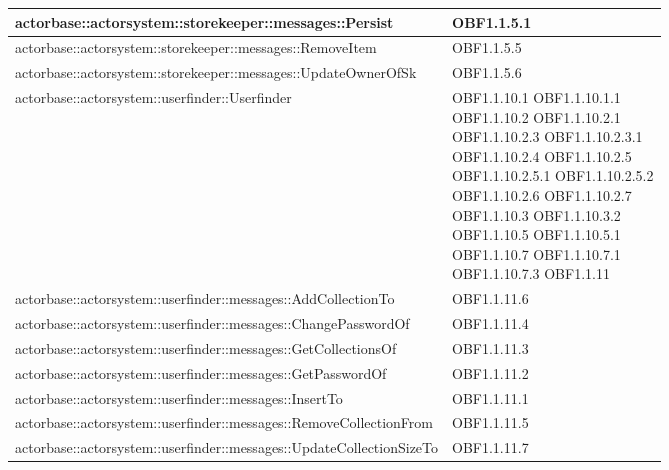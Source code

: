 \documentclass{scalatekids-article}
\begin{document}
\begin{longtable}[H]{|p{12cm}|p{5.5cm}|}
\hline
actorbase::actorsystem::storekeeper::messages::Persist & \multiLineCell[t]{OBF1.1.5.1\\}\\
\hline
actorbase::actorsystem::storekeeper::messages::RemoveItem & \multiLineCell[t]{OBF1.1.5.5\\}\\
\hline
actorbase::actorsystem::storekeeper::messages::UpdateOwnerOfSk & \multiLineCell[t]{OBF1.1.5.6\\}\\
\hline
actorbase::actorsystem::userfinder::Userfinder & \multiLineCell[t]{OBF1.1.10.1 OBF1.1.10.1.1\\OBF1.1.10.2 OBF1.1.10.2.1\\OBF1.1.10.2.3 OBF1.1.10.2.3.1\\OBF1.1.10.2.4 OBF1.1.10.2.5\\OBF1.1.10.2.5.1 OBF1.1.10.2.5.2\\OBF1.1.10.2.6 OBF1.1.10.2.7\\OBF1.1.10.3 OBF1.1.10.3.2\\OBF1.1.10.5 OBF1.1.10.5.1\\OBF1.1.10.7 OBF1.1.10.7.1\\OBF1.1.10.7.3 OBF1.1.11\\}\\
\hline
actorbase::actorsystem::userfinder::messages::AddCollectionTo & \multiLineCell[t]{OBF1.1.11.6\\}\\
\hline
actorbase::actorsystem::userfinder::messages::ChangePasswordOf & \multiLineCell[t]{OBF1.1.11.4\\}\\
\hline
actorbase::actorsystem::userfinder::messages::GetCollectionsOf & \multiLineCell[t]{OBF1.1.11.3\\}\\
\hline
actorbase::actorsystem::userfinder::messages::GetPasswordOf & \multiLineCell[t]{OBF1.1.11.2\\}\\
\hline
actorbase::actorsystem::userfinder::messages::InsertTo & \multiLineCell[t]{OBF1.1.11.1\\}\\
\hline
actorbase::actorsystem::userfinder::messages::RemoveCollectionFrom & \multiLineCell[t]{OBF1.1.11.5\\}\\
\hline
actorbase::actorsystem::userfinder::messages::UpdateCollectionSizeTo & \multiLineCell[t]{OBF1.1.11.7\\}\\

\end{longtable}
\end{document}
